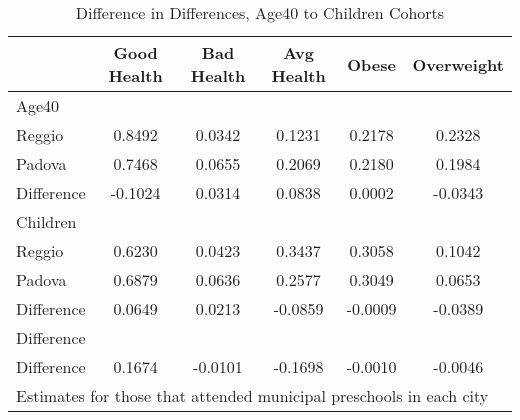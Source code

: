 \begin{table}[htbp]\centering
\caption{Difference in Differences, Age40 to Children Cohorts}
\begin{tabular}{l*{5}{c}}
\hline\hline
            & Good Health&  Bad Health&  Avg Health&       Obese&  Overweight\\
\hline
Age40       &            &            &            &            &            \\
Reggio      &      0.8492&      0.0342&      0.1231&      0.2178&      0.2328\\
Padova      &      0.7468&      0.0655&      0.2069&      0.2180&      0.1984\\
Difference  &     -0.1024&      0.0314&      0.0838&      0.0002&     -0.0343\\
\hline
Children    &            &            &            &            &            \\
Reggio      &      0.6230&      0.0423&      0.3437&      0.3058&      0.1042\\
Padova      &      0.6879&      0.0636&      0.2577&      0.3049&      0.0653\\
Difference  &      0.0649&      0.0213&     -0.0859&     -0.0009&     -0.0389\\
\hline
Difference  &            &            &            &            &            \\
Difference  &      0.1674&     -0.0101&     -0.1698&     -0.0010&     -0.0046\\
\hline\hline
\multicolumn{6}{l}{\footnotesize Estimates for those that attended municipal preschools in each city}\\
\end{tabular}
\end{table}
